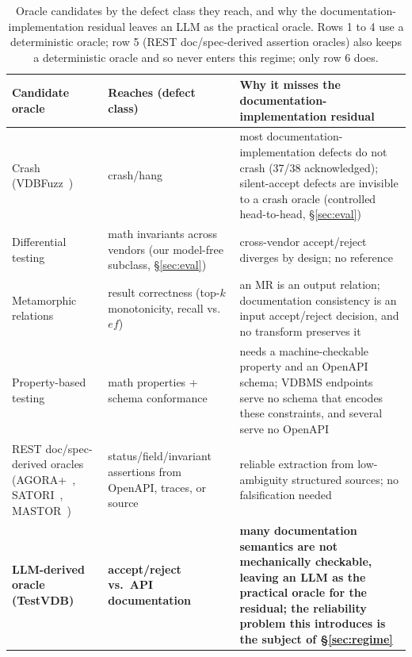 \documentclass[sigconf]{acmart}
\begin{document}
\begin{table}[t]
\caption{Oracle candidates by the defect class they reach, and why the documentation-implementation residual leaves an LLM as the practical oracle. Rows 1 to 4 use a deterministic oracle; row 5 (REST doc/spec-derived assertion oracles) also keeps a deterministic oracle and so never enters this regime; only row 6 does.}
\label{tab:exclusion}
\small
\begin{tabular}{@{}p{}p{}p{}@{}}
\toprule
Candidate oracle & Reaches (defect class) & Why it misses the documentation-implementation residual \\
\midrule
Crash (VDBFuzz~\cite{vdbfuzz26}) & crash/hang & most documentation-implementation defects do not crash (37/38 acknowledged); silent-accept defects are invisible to a crash oracle (controlled head-to-head, \S\ref{sec:eval}) \\
Differential testing & math invariants across vendors (our model-free subclass, \S\ref{sec:eval}) & cross-vendor accept/reject diverges by design; no reference~\cite{roadmap25} \\
Metamorphic relations~\cite{metmap24} & result correctness (top-$k$ monotonicity, recall vs.\ $ef$) & an MR is an output relation; documentation consistency is an input accept/reject decision, and no transform preserves it \\
Property-based testing~\cite{claessen00,schemathesis,quickrest20} & math properties + schema conformance & needs a machine-checkable property and an OpenAPI schema; VDBMS endpoints serve no schema that encodes these constraints, and several serve no OpenAPI \\
REST doc/spec-derived oracles (AGORA+~\cite{agoraplus25}, SATORI~\cite{satori25}, MASTOR~\cite{mastor26}) & status/field/invariant assertions from OpenAPI, traces, or source & reliable extraction from low-ambiguity structured sources; no falsification needed \\
\textbf{LLM-derived oracle (TestVDB)} & \textbf{accept/reject vs.\ API documentation} & \textbf{many documentation semantics are not mechanically checkable, leaving an LLM as the practical oracle for the residual; the reliability problem this introduces is the subject of \S\ref{sec:regime}} \\
\bottomrule
\end{tabular}
\end{table}
\end{document}
